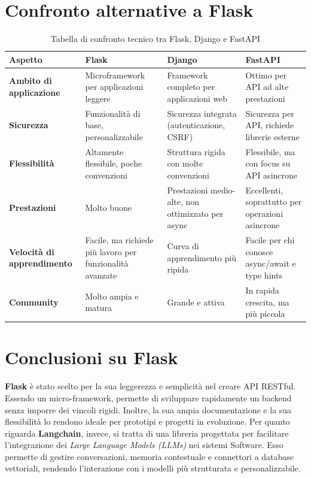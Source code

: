 \documentclass{article}
\begin{document}
\section{Confronto alternative a Flask}

\begin{table}[H]
    \renewcommand{\arraystretch}{1.7}
    \centering
    \begin{tabular}{|p{2.55cm}|p{4cm}|p{4cm}|p{4cm}|}
        \hline
        \textbf{Aspetto} & \textbf{\large Flask} & \textbf{\large Django} & \textbf{\large FastAPI} \\
        \hline
        \textbf{Ambito di applicazione} & Microframework per applicazioni leggere & Framework completo per applicazioni web & Ottimo per API ad alte prestazioni \\
        \hline
        \textbf{Sicurezza} & Funzionalità di base, personalizzabile & Sicurezza integrata (autenticazione, CSRF) & Sicurezza per API, richiede librerie esterne \\
        \hline
        \textbf{Flessibilità} & Altamente flessibile, poche convenzioni & Struttura rigida con molte convenzioni & Flessibile, ma con focus su API asincrone \\
        \hline
        \textbf{Prestazioni} & Molto buone & Prestazioni medio-alte, non ottimizzato per async & Eccellenti, soprattutto per operazioni asincrone \\
        \hline
        \textbf{Velocità di apprendimento} & Facile, ma richiede più lavoro per funzionalità avanzate & Curva di apprendimento più ripida & Facile per chi conosce async/await e type hints \\
        \hline
        \textbf{Community} & Molto ampia e matura & Grande e attiva & In rapida crescita, ma più piccola \\
        \hline
    \end{tabular}
    \caption{Tabella di confronto tecnico tra Flask, Django e FastAPI}
\end{table}

\section{Conclusioni su Flask}
\textbf{Flask} è stato scelto per la sua leggerezza e semplicità nel creare 
API RESTful. Essendo un micro-framework, permette di sviluppare 
rapidamente un backend senza imporre dei vincoli rigidi. 
Inoltre, la sua ampia documentazione e la sua flessibilità lo rendono 
ideale per prototipi e progetti in evoluzione.
Per quanto riguarda \textbf{Langchain}, invece, si tratta di una libreria
progettata per facilitare l'integrazione dei \textit{Large Language Models (LLMs)}
nei sistemi Software. Esso permette di gestire conversazioni, memoria
contestuale e connettori a database vettoriali, rendendo l'interazione 
con i modelli più strutturata e personalizzabile.
\end{document}
